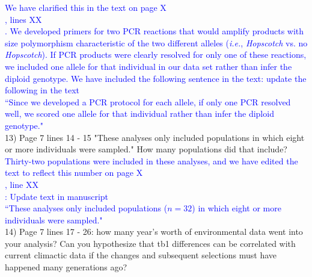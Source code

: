 \documentclass[11pt]{article}
\newcommand{\res}[1]{\noindent \textcolor{blue}{{#1}} \\}
\newcommand{\mbh}[1]{\noindent \textcolor{Dandelion}{{#1}}\\}
\begin{document}
\res{We have clarified this in the text on page \mbh{X}, lines \mbh{XX}.  We developed primers for two PCR reactions that would amplify products with size polymorphism characteristic of the two different alleles (\emph{i.e.}, \emph{Hopscotch} vs. no \emph{Hopscotch}). If PCR products were clearly resolved for only one of these reactions, we included one allele for that individual in our data set rather than infer the diploid genotype. We have included the following sentence in the text: \mbh{update the following in the text} ``Since we developed a PCR protocol for each allele, if only one PCR resolved well, we scored one allele for that individual rather than infer the diploid genotype."}

13) Page 7 lines 14 - 15 "These analyses only included populations in which eight or more individuals were sampled."  How many populations did that include?\\
 
\res{Thirty-two populations were included in these analyses, and we have edited the text to reflect this number on page \mbh{X}, line \mbh{XX}: \mbh{Update text in manuscript}``These analyses only included populations ($n = 32$) in which eight or more individuals were sampled."}

14) Page 7 lines 17 - 26: how many year's worth of environmental data went into your analysis? Can you hypothesize that tb1 differences can be correlated with current climactic data if the changes and subsequent selections must have happened many generations ago?\\
 
\end{document}
